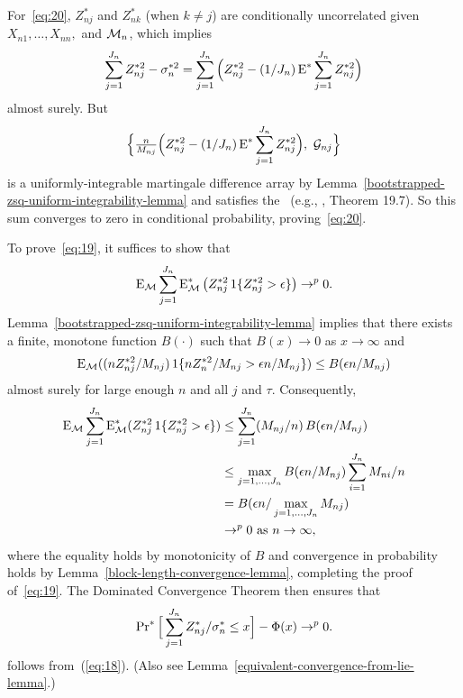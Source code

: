 \documentclass[11pt]{article}
\begin{document}
{For~\eqref{eq:20}, $Z_{nj}^*$ and $Z_{nk}^*$ (when $k \neq j$) are
conditionally uncorrelated given $X_{n1},\dots,X_{nn},$ and $\mathcal{M}_n$, which
implies
\begin{equation*}
  \sum_{j=1}^{J_n} Z_{nj}^{*2} - \sigma_n^{*2} =
  \sum_{j=1}^{J_n} \Big( Z_{nj}^{*2} - (1/J_n) \operatorname{E}^* \sum_{j=1}^{J_n} Z_{nj}^{*2} \Big)
\end{equation*}
almost surely. But
\begin{equation*}
   \Big\{\tfrac{n}{M_{nj}} \Big(Z_{nj}^{*2} - (1/J_n) \operatorname{E}^* \sum_{j=1}^{J_n} Z_{nj}^{*2}\Big),
   \ \mathcal{G}_{nj} \Big\}
\end{equation*}
is a uniformly-integrable martingale difference array
by Lemma~\ref{bootstrapped-zsq-uniform-integrability-lemma}
and satisfies the \lln\ (e.g., \citealp{Dav:94}, Theorem 19.7). So
this sum converges to zero in conditional probability, proving~\eqref{eq:20}.

To prove~\eqref{eq:19}, it suffices to show that
\begin{equation}\label{eq:21}
  \operatorname{E}_{\mathcal{M}} \sum_{j=1}^{J_n} \operatorname{E}_{\mathcal{M}}^{*}\big(Z_{nj}^{*2} \operatorname{1}\{Z_{nj}^{*2} > \epsilon\}\big) \to^p 0.
\end{equation}
Lemma~\ref{bootstrapped-zsq-uniform-integrability-lemma} implies that there exists a finite,
monotone function $B(\cdot)$ such that $B(x) \to 0$ as $x \to \infty$
and
\begin{equation*}
  \operatorname{E}_{\mathcal{M}}( (n Z_{nj}^{*2} / M_{nj}) \operatorname{1}\{n Z_n^{*2} / M_{nj} > \epsilon n / M_{nj}\}) \\
  \leq B(\epsilon n /M_{nj})
\end{equation*}
almost surely for large enough $n$ and all $j$ and $\tau$.  Consequently,
\begin{align*}
    \operatorname{E}_{\mathcal{M}} \sum_{j=1}^{J_n} \operatorname{E}_{\mathcal{M}}^{*}( Z_{nj}^{*2} \operatorname{1}\{Z_{nj}^{*2} > \epsilon\})
    & \leq \sum_{j=1}^{J_n} ( M_{nj} / n )\, B(\epsilon n /M_{nj}) \\
    & \leq \max_{j = 1,\dots,J_n} B(\epsilon n / M_{nj}) \sum_{i=1}^{J_n} M_{ni} / n \\
    & = B(\epsilon n / \max_{j = 1,\dots,J_n} M_{nj}) \\
    & \to^p 0 \text{\ as\ } n \to \infty,
\end{align*}
where the equality holds by monotonicity of $B$ and convergence in
probability holds by Lemma~\ref{block-length-convergence-lemma},
completing the proof of~\eqref{eq:19}.
The Dominated Convergence Theorem then ensures that
\begin{equation}\label{eq:22}
  \operatorname{Pr}^{*} \Big[\sum_{j=1}^{J_n}
  Z_{nj}^{*} / \sigma_n^* \leq x \Big] - \Phi(x) \to^p 0.
\end{equation}
follows from~(\ref{eq:18}). (Also see
Lemma~\ref{equivalent-convergence-from-lie-lemma}.)

}
\end{document}
